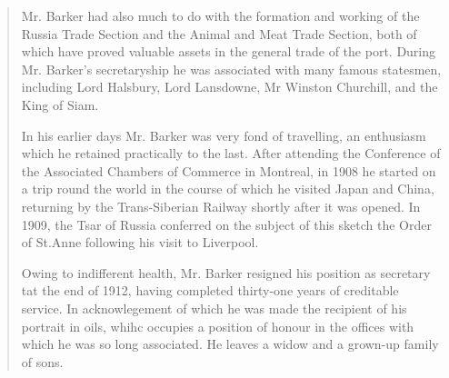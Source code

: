 \begin{quotation}
Mr. Barker had also much to do with the formation and working of the Russia Trade Section and the Animal and Meat Trade Section, both of which have proved valuable assets in the general trade of the port. During Mr. Barker's secretaryship he was associated with many famous statesmen, including Lord Halsbury, Lord Lansdowne, Mr Winston Churchill, and the King of Siam.

In his earlier days Mr. Barker was very fond of travelling, an enthusiasm which he retained practically to the last. After attending the Conference of the Associated Chambers of Commerce in Montreal, in 1908 he started on a trip round the world in the course of which he visited Japan and China, returning by the Trans-Siberian Railway shortly after it was opened.  In 1909, the Tsar of Russia conferred on the subject of this sketch the Order of St.Anne following his visit to Liverpool.

Owing to indifferent health, Mr. Barker resigned his position as secretary tat the end of 1912, having completed thirty-one years of creditable service. In acknowlegement of which he was made the recipient of his portrait in oils, whihc occupies a position of honour in the offices with which he was so long associated.  He leaves a widow and a grown-up family of sons.
\end{quotation} \cite{LiverpoolPost1917}

